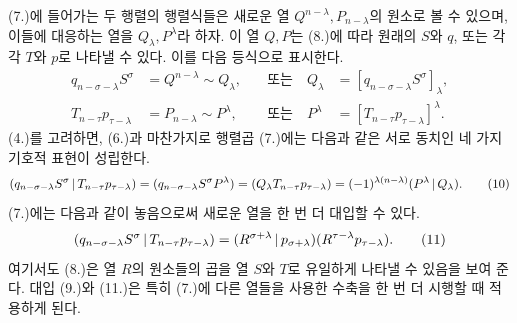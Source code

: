 (7.)에 들어가는 두 행렬의 행렬식들은 새로운 열 $Q^{n-\lambda},P_{n-\lambda}$의 원소로 볼 수 있으며, 이들에 대응하는 열을 $Q_\lambda,P^\lambda$라 하자. 이 열 $Q,P$는 (8.)에 따라 원래의 $S$와 $q$, 또는 각각 $T$와 $p$로 나타낼 수 있다. 이를 다음 등식으로 표시한다.
\begin{equation}
\begin{aligned}
 q_{n-\sigma-\lambda}S^\sigma&=Q^{n-\lambda}\sim Q_\lambda, &\quad\text{또는}\quad Q_\lambda&=[q_{n-\sigma-\lambda}S^\sigma]_\lambda,\\
 T_{n-\tau}p_{\tau-\lambda}&=P_{n-\lambda}\sim P^\lambda, &\quad\text{또는}\quad P^\lambda&=[T_{n-\tau}p_{\tau-\lambda}]^\lambda.
\end{aligned}
\tag{9}
\end{equation}
(4.)를 고려하면, (6.)과 마찬가지로 행렬곱 (7.)에는 다음과 같은 서로 동치인 네 가지 기호적 표현이 성립한다.
\begin{equation}
(q_{n-\sigma-\lambda}S^\sigma\,|\,T_{n-\tau}p_{\tau-\lambda})
=(q_{n-\sigma-\lambda}S^\sigma P^\lambda)=(Q_\lambda T_{n-\tau}p_{\tau-\lambda})=(-1)^{\lambda(n-\lambda)}(P^\lambda\,|\,Q_\lambda).
\tag{10}
\end{equation}
(7.)에는 다음과 같이 놓음으로써 새로운 열을 한 번 더 대입할 수 있다.
\begin{equation}
 (q_{n-\sigma-\lambda}S^\sigma\,|\,T_{n-\tau}p_{\tau-\lambda})
 =(R^{\sigma+\lambda}\,|\,p_{\sigma+\lambda})(R^{\tau-\lambda}p_{\tau-\lambda}).
\tag{11}
\end{equation}
여기서도 (8.)은 열 $R$의 원소들의 곱을 열 $S$와 $T$로 유일하게 나타낼 수 있음을 보여 준다. 대입 (9.)와 (11.)은 특히 (7.)에 다른 열들을 사용한 수축을 한 번 더 시행할 때 적용하게 된다.

